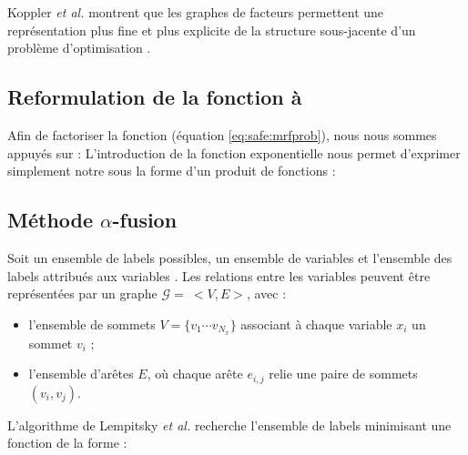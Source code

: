Koppler \textit{et al.}   montrent que les graphes de facteurs permettent une représentation plus fine et plus explicite de la structure sous-jacente d'un problème d'optimisation . 

\subsection{Reformulation de la fonction à }

Afin de factoriser la fonction  (équation \ref{eq:safe:mrfprob}), nous nous sommes appuyés sur  :
L'introduction de la fonction exponentielle nous permet d'exprimer simplement notre  sous la forme d'un produit de fonctions :

\subsection{Méthode $\alpha$-fusion}


Soit \modif{$\Lambda$} un ensemble de labels possibles,   un ensemble de variables et  l'ensemble des labels attribués aux variables . Les relations entre les variables  peuvent être représentées par un graphe $\mathcal{G} =\ <V,E>$, avec :
\begin{itemize}
\item l'ensemble de sommets $V= \lbrace v_{1}\cdots v_{N_{x}} \rbrace $ associant à chaque variable $x_{i}$ un sommet $v_{i}$ ;
\item l'ensemble d'arêtes $E$, où chaque arête $e_{i,j}$ relie une paire de sommets $(v_{i},v_{j})$. 
\end{itemize}

L'algorithme de  Lempitsky \textit{et al.} \cite{lempitsky2010fusion} recherche l'ensemble de labels  minimisant une fonction  de la forme :

